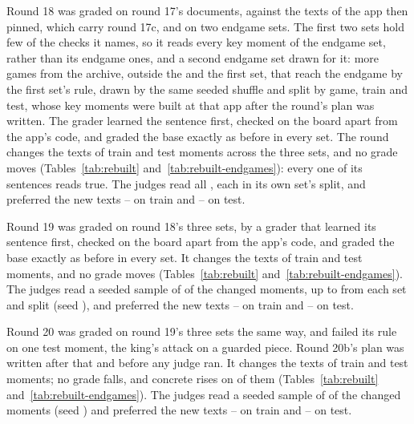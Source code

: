 \documentclass[11pt]{article}
\begin{document}
Round 18 was graded on round 17's documents, against the texts of the app then pinned, which carry
round 17c, and on two endgame sets. The first two sets hold few of the checks it names, so it reads
every key moment of the endgame set, \EndgameAllMoments{} rather than its \EndgameMoments{}
endgame ones, and a second endgame set drawn for it: \EndgameTwoGames{} more games from the
archive, outside the \Games{} and the first set, that reach the endgame by the first set's rule,
drawn by the same seeded shuffle and split by game, \EndgameTwoGamesTrain{} train and
\EndgameTwoGamesTest{} test, whose \EndgameTwoMoments{} key moments were built at that app after
the round's plan was written. The grader learned the sentence first, checked on the board apart
from the app's code, and graded the base exactly as before in every set. The round changes the
texts of \RoundEighteenChangedTrain{} train and \RoundEighteenChangedTest{} test moments across the
three sets, and no grade moves (Tables~\ref{tab:rebuilt} and~\ref{tab:rebuilt-endgames}): every one of its sentences reads true.
The judges read all \RoundEighteenJudged, each in its own set's split, and preferred the new texts
\RoundEighteenTrainNew--\RoundEighteenTrainOld{} on train and
\RoundEighteenTestNew--\RoundEighteenTestOld{} on test.

Round 19 was graded on round 18's three sets, by a grader that learned its sentence first, checked
on the board apart from the app's code, and graded the base exactly as before in every set. It
changes the texts of \RoundNineteenChangedTrain{} train and \RoundNineteenChangedTest{} test
moments, and no grade moves (Tables~\ref{tab:rebuilt} and~\ref{tab:rebuilt-endgames}). The judges read a seeded sample of
\RoundNineteenSampled{} of the \RoundNineteenChanged{} changed moments, up to \RoundNineteenPer{}
from each set and split (seed \RoundNineteenSeed), and preferred the new texts
\RoundNineteenTrainNew--\RoundNineteenTrainOld{} on train and
\RoundNineteenTestNew--\RoundNineteenTestOld{} on test.

Round 20 was graded on round 19's three sets the same way, and failed its rule on one test moment,
the king's attack on a guarded piece. Round 20b's plan was written after that and before any judge
ran. It changes the texts of \RoundTwentyChangedTrain{} train and \RoundTwentyChangedTest{} test
moments; no grade falls, and concrete rises on \RoundTwentyConcreteUp{} of them
(Tables~\ref{tab:rebuilt} and~\ref{tab:rebuilt-endgames}). The judges read a seeded sample of \RoundTwentySampled{} of the
\RoundTwentyChanged{} changed moments (seed \RoundTwentySeed) and preferred the new texts
\RoundTwentyTrainNew--\RoundTwentyTrainOld{} on train and
\RoundTwentyTestNew--\RoundTwentyTestOld{} on test.
\end{document}
